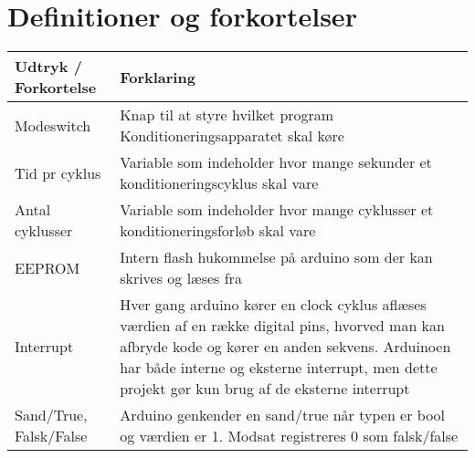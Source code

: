 	\section{Definitioner og forkortelser}
	\begin{longtable}{ |p{} |p{}| } 
		\hline
		\textbf{Udtryk / Forkortelse} &  \textbf{Forklaring} \\
		\hline
		Modeswitch & Knap til at styre hvilket program Konditioneringsapparatet skal køre \\
		\hline
		Tid pr cyklus & Variable som indeholder hvor mange sekunder et konditioneringscyklus skal vare \\
		\hline
		Antal cyklusser & Variable som indeholder hvor mange cyklusser et konditioneringsforløb skal vare \\
		\hline
		EEPROM & Intern flash hukommelse på arduino som der kan skrives og læses fra \\
		\hline
		Interrupt & Hver gang arduino kører en clock cyklus aflæses værdien af en række digital pins, hvorved man kan afbryde kode og kører en anden sekvens. Arduinoen har både interne og eksterne interrupt, men dette projekt gør kun brug af de eksterne interrupt \\
		\hline
		Sand/True, Falsk/False & Arduino genkender en sand/true når typen er bool og værdien er 1. Modsat registreres 0 som falsk/false \\
		\hline
	\end{longtable}